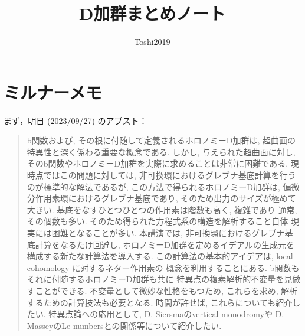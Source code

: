 


\def\inner<#1>{\langle #1 \rangle}

\def\ind<#1>{\mathop{\text{``}\hspace{-0.7pt}#1\limits\hspace{-1.5pt}\text{''}}}







\title{D加群まとめノート}
\author{Toshi2019}

\maketitle
\frontmatter
\tableofcontents
\layout
\mainmatter
\chapter{ミルナーメモ}
まず，明日 (2023/09/27) のアブスト：
\begin{quotation}
b関数および, その根に付随して定義されるホロノミーD加群は,
超曲面の特異性と深く係わる重要な概念である. 
しかし, 与えられた超曲面に対し, 
そのb関数やホロノミーD加群を実際に求めることは非常に困難である. 
現時点ではこの問題に対しては, 
非可換環におけるグレブナ基底計算を行うのが標準的な解法であるが, 
この方法で得られるホロノミーD加群は, 
偏微分作用素環におけるグレブナ基底であり, 
そのため出力のサイズが極めて大きい. 
基底をなすひとつひとつの作用素は階数も高く, 複雑であり
通常, その個数も多い. 
そのため得られた方程式系の構造を解析すること自体
現実には困難となることが多い. 
本講演では, 非可換環におけるグレブナ基底計算をなるたけ回避し, 
ホロノミーD加群を定めるイデアルの生成元を構成する新たな計算法を導入する. 
この計算法の基本的アイデアは, local cohomology に対するネター作用素の
概念を利用することにある. 
b関数もそれに付随するホロノミーD加群も共に
特異点の複素解析的不変量を見做すことができる. 
不変量として微妙な性格をもつため, 
これらを求め, 解析するための計算技法も必要となる. 
時間が許せば, これらについても紹介したい.
特異点論への応用として, 
D. Siersmaのvertical monodromyや
D. MasseyのLe numbersとの関係等について紹介したい.
\end{quotation}

